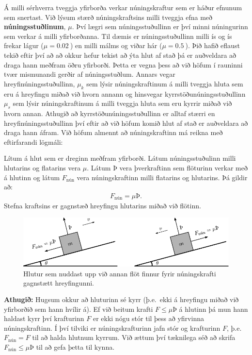 Á milli sérhverra tveggja yfirborða verkar núningskraftur sem er háður efnunum sem snertast. Við lýsum stærð núningskraftsins milli tveggja efna með \textbf{núningsstuðlinum}, $\mu$. Því lægri sem núningsstuðullinn er því minni núningurinn sem verkar á milli yfirborðanna. Til dæmis er núningsstuðullinn milli ís og ís frekar lágur ($\mu = \SI{0.02}{}$) en milli málms og viðar hár ($\mu = \SI{0.5}{}$). Þið hafið eflaust tekið eftir því að  að okkur hefur tekist að ýta hlut af stað þá er auðveldara að draga hann meðfram öðru yfirborði. Þetta er vegna þess að við höfum í rauninni tvær mismunandi gerðir af núningsstuðlum. Annars vegar hreyfinúningsstuðullinn, $\mu_k$ sem lýsir núningskraftinum á milli tveggja hluta sem eru á hreyfingu miðað við hvorn annann og hinsvegar kyrrstöðunúningsstuðullinn $\mu_s$ sem lýsir núningskraftinum á milli tveggja hluta sem eru kyrrir miðað við hvorn annan. Athugið að kyrrstöðunúningsstuðullinn er alltaf stærri en hreyfinúningsstuðullinn því eftir að við höfum komið hlut af stað er auðveldara að draga hann áfram. Við höfum almennt að núningskraftinn má reikna með eftirfarandi lögmáli:
\begin{tcolorbox}
\begin{theorem}
Lítum á hlut sem er dreginn meðfram yfirborði. Látum núningsstuðulinn milli hlutarins og flatarins vera $\mu$. Látum $\text{Þ}$ vera þverkraftinn sem flöturinn verkar með á hlutinn og látum $F_{\text{nún}}$ vera núningskraftinn milli flatarins og hlutarins. Þá gildir að:
\begin{align*}
    F_{\text{nún}} = \mu \text{Þ}.
\end{align*}
Stefna kraftsins er gagnstæð hreyfingu hlutarins miðað við flötinn.
\end{theorem}
\end{tcolorbox}

\begin{figure}[H]
    \centering
    \includegraphics{figures/nun.pdf}
    \caption{Hlutur sem nuddast upp við annan flöt finnur fyrir núningskrafti gagnstætt hreyfingunni.}
    \label{fig:fnun}
\end{figure}

\textbf{Athugið:} Hugsum okkur að hluturinn sé kyrr (þ.e.~ekki á hreyfingu miðað við yfirborðið sem hann hvílir á). Ef við beitum krafti $F \leq \mu Þ$ á hlutinn þá mun hann haldast kyrr því krafturinn $F$ er ekki nógu stór til þess að yfirvinna núningskraftinn. Í því tilviki er núningskrafturinn jafn stór og krafturinn $F$, þ.e. $F_{\text{nún}} = F$ til að halda hlutnum kyrrum. Við ættum því tæknilega séð að skrifa $F_{\text{nún}} \leq \mu Þ$ til að gefa þetta til kynna.


